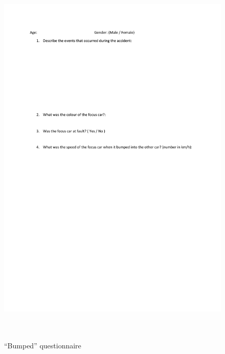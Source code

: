 \documentclass[11pt]{article}
\begin{document}
\begin{figure}[H]
  \caption{ ~\\``Bumped'' questionnaire} 
  \centering 
  \includegraphics[width=\textwidth]{bumped.pdf}
~\label{ques:bumped}
\end{figure} 
\end{document}
